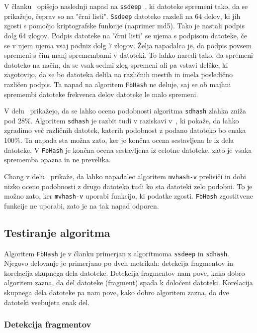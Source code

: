 \documentclass{acm_proc_article-sp}
\begin{document}
V članku~\cite{5931110} opišejo naslednji napad na \texttt{ssdeep}~\cite{kornblum:ctph}, ki datoteke spremeni tako, da se prikažejo, čeprav so na "črni listi". \texttt{Ssdeep} datoteko razdeli na 64 delov, ki jih zgosti s pomočjo kriptografske funkcije (naprimer md5). Tako je nastali podpis dolg 64 zlogov. Podpis datoteke na "črni listi" se ujema s podpisom datoteke, če se v njem ujema vsaj podniz dolg 7 zlogov. Želja napadalca je, da podpis povsem spremeni s čim manj spremembami v datoteki. To lahko naredi tako, da spremeni datoteko na način, da se vsak sedmi zlog spremeni ali pa vstavi delčke, ki zagotovijo, da se bo datoteka delila na različnih mestih in imela posledično različen podpis. Ta napad na algoritem \texttt{FbHash} ne deluje, saj se ob majhni spremembi datoteke frekvenca delov datoteke le malo spremeni.

V delu~\cite{breitinger2012security} prikažejo, da se lahko oceno podobnosti algoritma \texttt{sdhash} zlahka zniža pod 28\%. Algoritem \texttt{sdhash} je razbit tudi v raziskavi v~\cite{chang2015collision}, ki pokaže, da lahko zgradimo več različnih datotek, katerih podobnost z podano datoteko bo enaka 100\%. Ta napada sta možna zato, ker je končna ocena sestavljena le iz dela datoteke. V \texttt{FbHash} je končna ocena sestavljena iz celotne datoteke, zato je vsaka sprememba opazna in ne prevelika.

Chang v delu~\cite{chang2016security} prikaže, da lahko napadalec algoritem \texttt{mvhash-v} prelisiči in dobi nizko oceno podobnosti z drugo datoteko tudi ko sta datoteki zelo podobni. To je možno zato, ker \texttt{mvhash-v} uporabi funkcijo, ki podatke zgosti. \texttt{FbHash} zgostitvene funkcije ne uporabi, zato je na tak napad odporen.

\subsection{Testiranje algoritma}
Algoritem \texttt{FbHash} je v članku primerjan z algoritmoma \texttt{ssdeep} in \texttt{sdhash}. Njegovo delovanje je primerjano po dveh metrikah: detekcija fragmentov in korelacija skupnega dela datoteke. Detekcija fragmentov nam pove, kako dobro algoritem zazna, da del datoteke (fragment) spada k določeni datoteki. Korelacija skupnega dela datoteke pa nam pove, kako dobro algoritem zazna, da dve datoteki vsebujeta enak del.

\subsubsection{Detekcija fragmentov}
\end{document}
